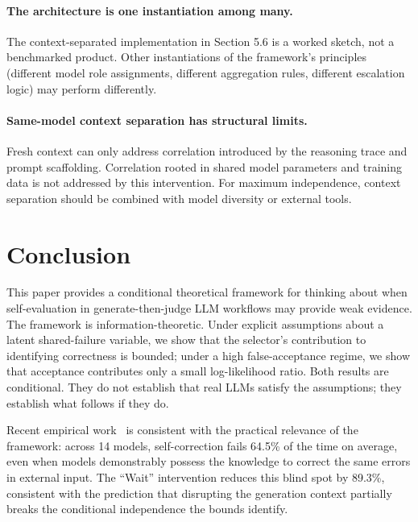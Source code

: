 \documentclass[11pt]{article}
\begin{document}
\paragraph{The architecture is one instantiation among many.} The context-separated implementation in Section 5.6 is a worked sketch, not a benchmarked product. Other instantiations of the framework's principles (different model role assignments, different aggregation rules, different escalation logic) may perform differently.

\paragraph{Same-model context separation has structural limits.} Fresh context can only address correlation introduced by the reasoning trace and prompt scaffolding. Correlation rooted in shared model parameters and training data is not addressed by this intervention. For maximum independence, context separation should be combined with model diversity or external tools.

\section{Conclusion}

This paper provides a conditional theoretical framework for thinking about when self-evaluation in generate-then-judge LLM workflows may provide weak evidence. The framework is information-theoretic. Under explicit assumptions about a latent shared-failure variable, we show that the selector's contribution to identifying correctness is bounded; under a high false-acceptance regime, we show that acceptance contributes only a small log-likelihood ratio. Both results are conditional. They do not establish that real LLMs satisfy the assumptions; they establish what follows if they do.

Recent empirical work~\citep{tsui2025selfcorrection} is consistent with the practical relevance of the framework: across 14 models, self-correction fails 64.5\% of the time on average, even when models demonstrably possess the knowledge to correct the same errors in external input. The ``Wait'' intervention reduces this blind spot by 89.3\%, consistent with the prediction that disrupting the generation context partially breaks the conditional independence the bounds identify.
\end{document}
